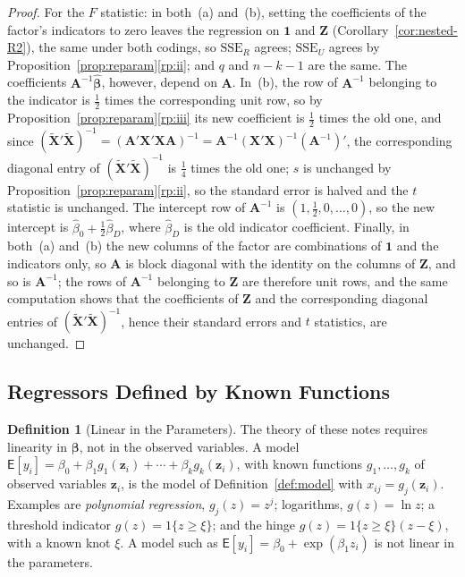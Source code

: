 \documentclass[14pt]{extarticle}
\theoremstyle{plain}
\theoremstyle{definition}
\newtheorem{definition}[theorem]{Definition}
\theoremstyle{remark}
\newcommand\expc{\mathsf{E}}
\newcommand{\SSE}{\mathrm{SSE}}
\newcommand{\bX}{\mathbf{X}}
\def\bb{\boldsymbol{\beta}}
\newcommand{\bone}{\mathbf{1}}
\newcommand{\bA}{\mathbf{A}}
\begin{document}
\begin{proof}
For the $F$ statistic: in both~(a) and~(b), setting the coefficients of the factor's indicators to zero leaves the regression on $\bone$ and $\mathbf{Z}$ (Corollary~\ref{cor:nested-R2}), the same under both codings, so $\SSE_R$ agrees; $\SSE_U$ agrees by Proposition~\ref{prop:reparam}\ref{rp:ii}; and $q$ and $n - k - 1$ are the same. The coefficients $\bA^{-1}\hat{\bb}$, however, depend on $\bA$. In~(b), the row of $\bA^{-1}$ belonging to the indicator is $\frac{1}{2}$ times the corresponding unit row, so by Proposition~\ref{prop:reparam}\ref{rp:iii} its new coefficient is $\frac{1}{2}$ times the old one, and since $(\tilde{\bX}'\tilde{\bX})^{-1} = (\bA'\bX'\bX\bA)^{-1} = \bA^{-1}(\bX'\bX)^{-1}(\bA^{-1})'$, the corresponding diagonal entry of $(\tilde{\bX}'\tilde{\bX})^{-1}$ is $\frac{1}{4}$ times the old one; $s$ is unchanged by Proposition~\ref{prop:reparam}\ref{rp:ii}, so the standard error is halved and the $t$ statistic is unchanged. The intercept row of $\bA^{-1}$ is $(1, \frac{1}{2}, 0, \ldots, 0)$, so the new intercept is $\hat\beta_0 + \frac{1}{2}\hat\beta_D$, where $\hat\beta_D$ is the old indicator coefficient. Finally, in both~(a) and~(b) the new columns of the factor are combinations of $\bone$ and the indicators only, so $\bA$ is block diagonal with the identity on the columns of $\mathbf{Z}$, and so is $\bA^{-1}$; the rows of $\bA^{-1}$ belonging to $\mathbf{Z}$ are therefore unit rows, and the same computation shows that the coefficients of $\mathbf{Z}$ and the corresponding diagonal entries of $(\tilde{\bX}'\tilde{\bX})^{-1}$, hence their standard errors and $t$ statistics, are unchanged.
\end{proof}

\subsection{Regressors Defined by Known Functions}

\begin{definition}[Linear in the Parameters]\label{def:linear-params}
The theory of these notes requires linearity in $\bb$, not in the observed variables. A model $\expc[y_i] = \beta_0 + \beta_1g_1(\mathbf{z}_i) + \cdots + \beta_kg_k(\mathbf{z}_i)$, with known functions $g_1, \ldots, g_k$ of observed variables $\mathbf{z}_i$, is the model of Definition~\ref{def:model} with $x_{ij} = g_j(\mathbf{z}_i)$. Examples are \emph{polynomial regression}, $g_j(z) = z^j$; logarithms, $g(z) = \ln z$; a threshold indicator $g(z) = 1\{z \geqslant \xi\}$; and the hinge $g(z) = 1\{z \geqslant \xi\}(z - \xi)$, with a known knot $\xi$. A model such as $\expc[y_i] = \beta_0 + \exp(\beta_1z_i)$ is not linear in the parameters.
\end{definition}
\end{document}
